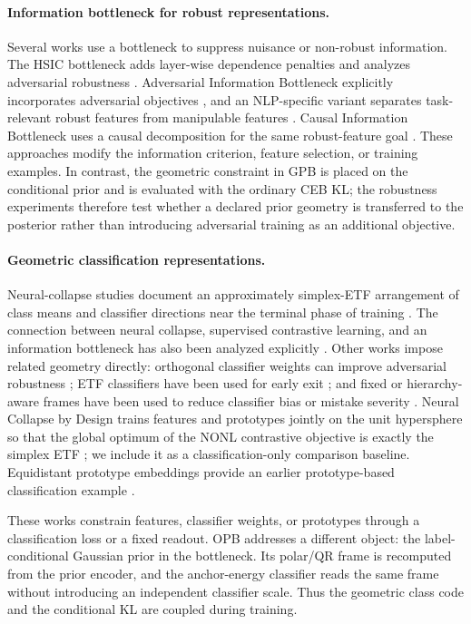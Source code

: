\paragraph{Information bottleneck for robust representations.}
Several works use a bottleneck to suppress nuisance or non-robust information. The
HSIC bottleneck adds layer-wise dependence penalties and analyzes adversarial
robustness \citep{wang2021hsic}. Adversarial Information Bottleneck explicitly
incorporates adversarial objectives \citep{zhai2022adversarial}, and an NLP-specific
variant separates task-relevant robust features from manipulable features
\citep{zhang2022nl_ib}. Causal Information Bottleneck uses a causal decomposition
for the same robust-feature goal \citep{hua2022causal}. These approaches modify the
information criterion, feature selection, or training examples. In contrast, the
geometric constraint in GPB is placed on the conditional prior and is evaluated with
the ordinary CEB KL; the robustness experiments therefore test whether a declared
prior geometry is transferred to the posterior rather than introducing adversarial
training as an additional objective.

\paragraph{Geometric classification representations.}
Neural-collapse studies document an approximately simplex-ETF arrangement of class
means and classifier directions near the terminal phase of training
\citep{papyan2020prevalence,zhu2021geometric_nc}. The connection between neural
collapse, supervised contrastive learning, and an information bottleneck has also
been analyzed explicitly \citep{wang2023ib_nc}. Other works impose related geometry
directly: orthogonal classifier weights can improve adversarial robustness
\citep{xu2022orthogonal}; ETF classifiers have been used for early exit
\citep{ji2023etf}; and fixed or hierarchy-aware frames have been used to reduce
classifier bias or mistake severity \citep{tong2023fixed_frame}. Neural Collapse
by Design trains features and prototypes jointly on the unit hypersphere so that
the global optimum of the NONL contrastive objective is exactly the simplex ETF
\citep{koromilas2026neural}; we include it as a classification-only comparison
baseline. Equidistant prototype embeddings provide an earlier prototype-based
classification example \citep{deng2014equidistant}.

These works constrain features, classifier weights, or prototypes through a
classification loss or a fixed readout. OPB addresses a different object: the
label-conditional Gaussian prior in the bottleneck. Its polar/QR frame is recomputed
from the prior encoder, and the anchor-energy classifier reads the same frame without
introducing an independent classifier scale. Thus the geometric class code and the
conditional KL are coupled during training.

